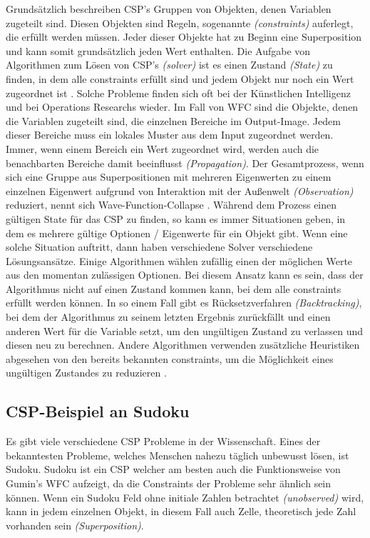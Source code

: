 \documentclass[12pt, a4paper,twoside,openany]{report} %
\begin{document}
Grundsätzlich beschreiben CSP's Gruppen von Objekten, denen Variablen zugeteilt sind.
Diesen Objekten sind Regeln, sogenannte \textit{(constraints)} auferlegt, die erfüllt werden müssen.
Jeder dieser Objekte hat zu Beginn eine Superposition und kann somit grundsätzlich jeden Wert enthalten.
Die Aufgabe von Algorithmen zum Lösen von CSP's \textit{(solver)} ist es einen Zustand \textit{(State)} zu finden,
in dem alle constraints erfüllt sind und jedem Objekt nur noch ein Wert zugeordnet ist \cite{Lecoutre2009ConstraintNT}.
Solche Probleme finden sich oft bei der Künstlichen Intelligenz und bei Operations Researchs wieder.
Im Fall von WFC sind die Objekte, denen die Variablen zugeteilt sind, die einzelnen Bereiche im Output-Image.
Jedem dieser Bereiche muss ein lokales Muster aus dem Input zugeordnet werden.
Immer, wenn einem Bereich ein Wert zugeordnet wird, werden auch die benachbarten Bereiche damit beeinflusst \textit{(Propagation)}.
Der Gesamtprozess, wenn sich eine Gruppe aus Superpositionen mit mehreren Eigenwerten zu einem einzelnen Eigenwert aufgrund von Interaktion mit der Außenwelt \textit{(Observation)} reduziert,
nennt sich Wave-Function-Collapse \cite{Zinkernagel_2016}.
Während dem Prozess einen gültigen State für das CSP zu finden, so kann es immer Situationen geben, in dem es mehrere gültige Optionen / Eigenwerte für ein Objekt gibt.
Wenn eine solche Situation auftritt, dann haben verschiedene Solver verschiedene Lösungsansätze.
Einige Algorithmen wählen zufällig einen der möglichen Werte aus den momentan zulässigen Optionen.
Bei diesem Ansatz kann es sein, dass der Algorithmus nicht auf einen Zustand kommen kann, bei dem alle constraints erfüllt werden können.
In so einem Fall gibt es Rücksetzverfahren \textit{(Backtracking)}, bei dem der Algorithmus zu seinem letzten Ergebnis zurückfällt und einen anderen Wert für die Variable setzt,
um den ungültigen Zustand zu verlassen und diesen neu zu berechnen.
Andere Algorithmen verwenden zusätzliche Heuristiken abgesehen von den bereits bekannten constraints, um die Möglichkeit eines ungültigen Zustandes zu reduzieren \cite{Karth2017WaveFunctionCollapseIC}.
\pagebreak

\subsection{CSP-Beispiel an Sudoku}
Es gibt viele verschiedene CSP Probleme in der Wissenschaft.
Eines der bekanntesten Probleme, welches Menschen nahezu täglich unbewusst lösen, ist Sudoku.
Sudoku ist ein CSP welcher am besten auch die Funktionsweise von Gumin's WFC aufzeigt, da die Constraints der Probleme sehr ähnlich sein können.
Wenn ein Sudoku Feld ohne initiale Zahlen betrachtet \textit{(unobserved)} wird, kann in jedem einzelnen Objekt, in diesem Fall auch Zelle, theoretisch jede Zahl vorhanden sein \textit{(Superposition)}.
\end{document}
